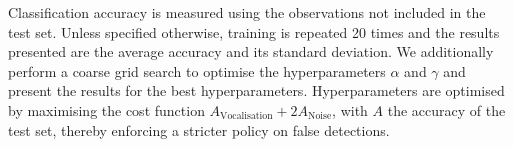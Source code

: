 {Classification accuracy is measured using the observations not included in the test set. Unless specified otherwise, training is repeated 20 times and the results presented are the average accuracy and its standard deviation. We additionally perform a coarse grid search to optimise the hyperparameters $\alpha$ and $\gamma$ and present the results for the best hyperparameters. Hyperparameters are optimised by maximising the cost function $A_\text{Vocalisation} + 2A_\text{Noise}$, with $A$ the accuracy of the test set, thereby enforcing a stricter policy on false detections.






}
